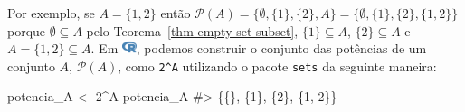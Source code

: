\documentclass[
  letterpaper,
]{book}
\newenvironment{Shaded}{\begin{snugshade}}{\end{snugshade}}
\newcommand{\CommentTok}[1]{\textcolor[rgb]{0.37,0.37,0.37}{#1}}
\newcommand{\DecValTok}[1]{\textcolor[rgb]{0.68,0.00,0.00}{#1}}
\newcommand{\NormalTok}[1]{\textcolor[rgb]{0.00,0.23,0.31}{#1}}
\newcommand{\OtherTok}[1]{\textcolor[rgb]{0.00,0.23,0.31}{#1}}
\newcommand{\SpecialCharTok}[1]{\textcolor[rgb]{0.37,0.37,0.37}{#1}}
\theoremstyle{plain}
\theoremstyle{definition}
\theoremstyle{remark}
\begin{document}
Por exemplo, se \(A = \{ 1, 2 \}\) então
\(\mathcal{P}(A) = \{ \emptyset, \{ 1 \}, \{ 2 \}, A \} = \{ \emptyset, \{ 1 \}, \{ 2 \}, \{ 1,2 \} \}\)
porque \(\emptyset \subseteq A\) pelo
Teorema~\ref{thm-empty-set-subset}, \(\{ 1 \} \subseteq A\),
\(\{ 2 \} \subseteq A\) e \(A = \{ 1, 2 \} \subseteq A\). Em
\includegraphics[width=1.13em,height=1em]{naive_set_theory_files/figure-pdf/fa-icon-9b00320707d42527dde67262afb33ded.pdf},
podemos construir o conjunto das potências de um conjunto \(A\),
\(\mathcal{P}(A)\), como \texttt{2\^{}A} utilizando o pacote
\texttt{sets} da seguinte maneira:

\begin{Shaded}
\begin{Highlighting}[]
\NormalTok{potencia\_A }\OtherTok{\textless{}{-}} \DecValTok{2}\SpecialCharTok{\^{}}\NormalTok{A}
\NormalTok{potencia\_A}
\CommentTok{\#\textgreater{} \{\{\}, \{1\}, \{2\}, \{1, 2\}\}}
\end{Highlighting}
\end{Shaded}



\backmatter
\end{document}
